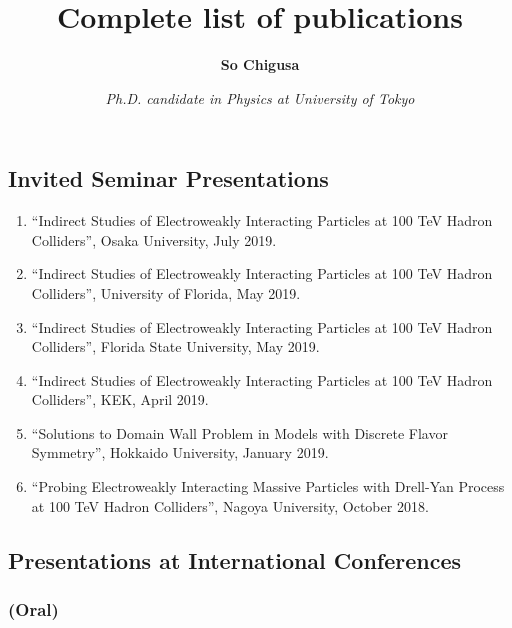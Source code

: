 \documentclass[12pt,notitlepage]{article}
\title{\vspace*{-3cm}Complete list of publications}
\author{\textbf{So Chigusa}}
\date{\vspace*{-4mm}\textit{Ph.D. candidate in Physics at University of Tokyo}}
\begin{document}
\maketitle

\nocite{*}



\subsection*{Invited Seminar Presentations}

\begin{enumerate}
  \item ``Indirect Studies of Electroweakly Interacting Particles at 100 TeV Hadron Colliders'', Osaka University, July 2019.
  \item ``Indirect Studies of Electroweakly Interacting Particles at 100 TeV Hadron Colliders'', University of Florida, May 2019.
  \item ``Indirect Studies of Electroweakly Interacting Particles at 100 TeV Hadron Colliders'', Florida State University, May 2019.
  \item ``Indirect Studies of Electroweakly Interacting Particles at 100 TeV Hadron Colliders'', KEK, April 2019.
  \item ``Solutions to Domain Wall Problem in Models with Discrete Flavor Symmetry'', Hokkaido University, January 2019.
  \item ``Probing Electroweakly Interacting Massive Particles with Drell-Yan Process at 100 TeV Hadron Colliders'', Nagoya University, October 2018.
\end{enumerate}

\subsection*{Presentations at International Conferences}

\subsubsection*{(Oral)}
\end{document}
